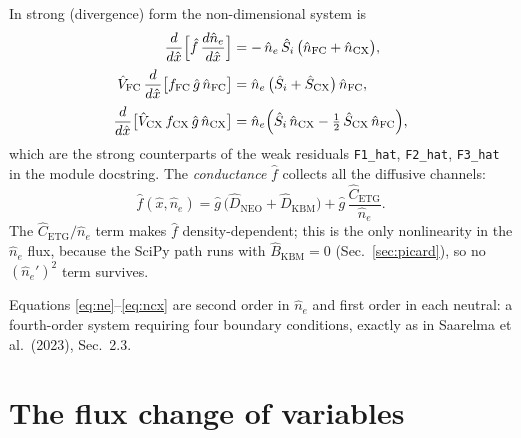 \documentclass[11pt]{article}
\newcommand{\hn}{\hat{n}}
\newcommand{\hx}{\hat{x}}
\newcommand{\hg}{\hat{g}}
\newcommand{\hS}{\hat{S}}
\newcommand{\hV}{\hat{V}}
\newcommand{\hD}{\hat{D}}
\newcommand{\hf}{\hat{f}}
\newcommand{\code}[1]{\texttt{#1}}
\begin{document}
In strong (divergence) form the non-dimensional system is
\begin{align}
  \frac{d}{d\hx}\Bigl[ \hf\, \frac{d\hn_e}{d\hx} \Bigr]
    &= -\,\hn_e\,\hS_i\,\bigl(\hn_{\mathrm{FC}} + \hn_{\mathrm{CX}}\bigr),
    \label{eq:ne} \\[2pt]
  \hV_{\mathrm{FC}}\,\frac{d}{d\hx}
    \bigl[ f_{\mathrm{FC}}\,\hg\,\hn_{\mathrm{FC}} \bigr]
    &= \hn_e\,\bigl(\hS_i + \hS_{\mathrm{CX}}\bigr)\,\hn_{\mathrm{FC}},
    \label{eq:nfc} \\[2pt]
  \frac{d}{d\hx}
    \bigl[ \hV_{\mathrm{CX}}\,f_{\mathrm{CX}}\,\hg\,\hn_{\mathrm{CX}} \bigr]
    &= \hn_e\Bigl(\hS_i\,\hn_{\mathrm{CX}}
        - \tfrac{1}{2}\,\hS_{\mathrm{CX}}\,\hn_{\mathrm{FC}}\Bigr),
    \label{eq:ncx}
\end{align}
which are the strong counterparts of the weak residuals
\code{F1\_hat}, \code{F2\_hat}, \code{F3\_hat} in the module docstring.
The \emph{conductance} $\hf$ collects all the diffusive channels:
\begin{equation}
  \hf(\hx, \hn_e)
    = \hg\,\bigl(\hD_{\mathrm{NEO}} + \hD_{\mathrm{KBM}}\bigr)
    + \hg\,\frac{\hat{C}_{\mathrm{ETG}}}{\hn_e}.
  \label{eq:conductance}
\end{equation}
The $\hat{C}_{\mathrm{ETG}}/\hn_e$ term makes $\hf$ density-dependent;
this is the only nonlinearity in the $\hn_e$ flux, because the SciPy
path runs with $\hat{B}_{\mathrm{KBM}} = 0$
(Sec.~\ref{sec:picard}), so no $(\hn_e')^2$ term survives.

Equations \eqref{eq:ne}--\eqref{eq:ncx} are second order in $\hn_e$ and
first order in each neutral: a fourth-order system requiring four
boundary conditions, exactly as in Saarelma et al.~(2023), Sec.~2.3.

\section{The flux change of variables}
\label{sec:flux}
\end{document}
